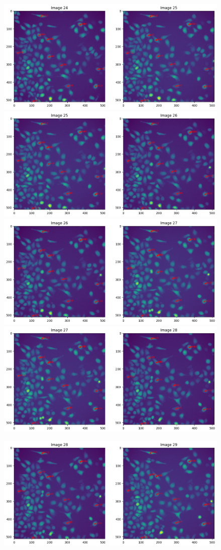 \documentclass{article}
\begin{document}
\begin{figure}[h!]
\centering
\includegraphics[width=0.75\linewidth]{Report/RImages/Traces_Control/image_25a.png}
\includegraphics[width=0.75\linewidth]
{Report/RImages/Traces_Control/image_26a.png}
\includegraphics[width=0.75\linewidth]
{Report/RImages/Traces_Control/image_27a.png}
\includegraphics[width=0.75\linewidth]{Report/RImages/Traces_Control/image_28a.png}
\end{figure}
\begin{figure}[h!]
\centering
\includegraphics[width=0.75\linewidth]{Report/RImages/Traces_Control/image_29a.png}
\end{figure}
\end{document}
